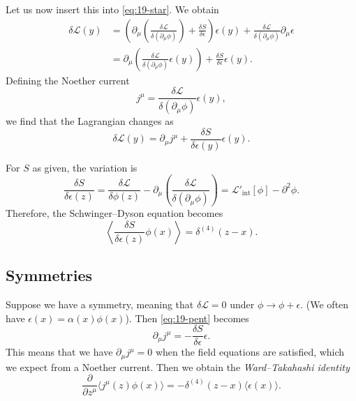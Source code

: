 Let us now insert this into \eqref{eq:19-star}.
We obtain
\begin{align}
  \delta \mathscr{L} (y) &= \left( \partial_{\mu} \left( \frac{\delta \mathscr{L}}{\delta (\partial_{\mu} \phi)} \right) + \frac{\delta S}{\delta \epsilon} \right) \epsilon(y) + \frac{\delta \mathscr{L}}{\delta (\partial_{\mu} \phi)} \partial_{\mu} \epsilon \\
			 &= \partial_{\mu} \left( \frac{\delta \mathscr{L}}{\delta (\partial_{\mu} \phi)} \epsilon(y) \right) + \frac{\delta S}{\delta \epsilon} \epsilon(y).
\end{align}
Defining the Noether current
\begin{equation}
  j^{\mu} = \frac{\delta \mathscr{L}}{\delta (\partial_{\mu} \phi)} \epsilon(y),
\end{equation}
we find that the Lagrangian changes as
\begin{equation}
  \label{eq:19-pent}
  \delta \mathscr{L}(y) = \partial_{\mu} j^{\mu} + \frac{\delta S}{\delta \epsilon(y)} \epsilon(y).
\end{equation}

For $S$ as given, the variation is
\begin{equation}
  \frac{\delta S}{\delta \epsilon(z)} = \frac{\delta \mathscr{L}}{\delta \phi(z)} - \partial_{\mu} \left( \frac{\delta \mathscr{L}}{\delta (\partial_{\mu} \phi)} \right) = \mathscr{L}'_{\text{int}}[\phi] - \partial^2 \phi.
\end{equation}
Therefore, the Schwinger--Dyson equation becomes
\begin{equation}
  \left\langle \frac{\delta S}{\delta \epsilon(z)} \phi(x) \right\rangle = \delta^{(4)} (z - x).
\end{equation}

\subsection{Symmetries}%
\label{sub:symmetries}

Suppose we have a symmetry, meaning that $\delta \mathscr{L} = 0$ under $\phi \to \phi + \epsilon$. (We often have $\epsilon(x) = \alpha(x) \phi(x)$).
Then \eqref{eq:19-pent} becomes
\begin{equation}
  \partial_{\mu} j^{\mu} = - \frac{\delta S}{\delta \epsilon} \epsilon.
\end{equation}
This means that we have $\partial_{\mu} j^{\mu} = 0$ when the field equations are satisfied, which we expect from a Noether current.
Then we obtain the \emph{Ward--Takahashi identity}
\begin{equation}
  \frac{\partial }{\partial z^{\mu}} \langle j^{\mu}(z) \phi(x) \rangle = - \delta^{(4)} (z - x) \langle \epsilon(x) \rangle.
\end{equation}

